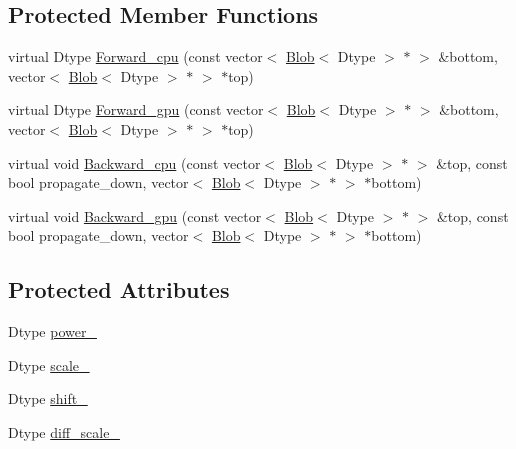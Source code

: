 \subsection*{Protected Member Functions}
\begin{DoxyCompactItemize}
\item 
virtual Dtype \hyperlink{classcaffe_1_1_power_layer_a3efa0e32fd71a6562838359915e05a03}{Forward\+\_\+cpu} (const vector$<$ \hyperlink{classcaffe_1_1_blob}{Blob}$<$ Dtype $>$ $\ast$ $>$ \&bottom, vector$<$ \hyperlink{classcaffe_1_1_blob}{Blob}$<$ Dtype $>$ $\ast$ $>$ $\ast$top)
\item 
virtual Dtype \hyperlink{classcaffe_1_1_power_layer_ad59217de2d3c6d0c363b89713155eae5}{Forward\+\_\+gpu} (const vector$<$ \hyperlink{classcaffe_1_1_blob}{Blob}$<$ Dtype $>$ $\ast$ $>$ \&bottom, vector$<$ \hyperlink{classcaffe_1_1_blob}{Blob}$<$ Dtype $>$ $\ast$ $>$ $\ast$top)
\item 
virtual void \hyperlink{classcaffe_1_1_power_layer_a44971f370af2adc06adf814d9465a371}{Backward\+\_\+cpu} (const vector$<$ \hyperlink{classcaffe_1_1_blob}{Blob}$<$ Dtype $>$ $\ast$ $>$ \&top, const bool propagate\+\_\+down, vector$<$ \hyperlink{classcaffe_1_1_blob}{Blob}$<$ Dtype $>$ $\ast$ $>$ $\ast$bottom)
\item 
virtual void \hyperlink{classcaffe_1_1_power_layer_a4f127b9f0a3977137f56e6e7a1184241}{Backward\+\_\+gpu} (const vector$<$ \hyperlink{classcaffe_1_1_blob}{Blob}$<$ Dtype $>$ $\ast$ $>$ \&top, const bool propagate\+\_\+down, vector$<$ \hyperlink{classcaffe_1_1_blob}{Blob}$<$ Dtype $>$ $\ast$ $>$ $\ast$bottom)
\end{DoxyCompactItemize}
\subsection*{Protected Attributes}
\begin{DoxyCompactItemize}
\item 
Dtype \hyperlink{classcaffe_1_1_power_layer_a882ce133988e4dd72a10d87fec4c04c3}{power\+\_\+}
\item 
Dtype \hyperlink{classcaffe_1_1_power_layer_a6684b2c6c2b2047d58c9d2809b86c39c}{scale\+\_\+}
\item 
Dtype \hyperlink{classcaffe_1_1_power_layer_a3a3143c4d6735d12cb5a41b1cb623bc9}{shift\+\_\+}
\item 
Dtype \hyperlink{classcaffe_1_1_power_layer_aa83169eaa1b573137aa6ed2b526879f0}{diff\+\_\+scale\+\_\+}
\end{DoxyCompactItemize}


